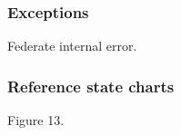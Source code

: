 \clearpage

\begin{compactstdpage}
    \subsubsection{Exceptions}
    \begin{stdalphalist}
        \item Federate internal error.
    \end{stdalphalist}

    \subsubsection{Reference state charts}
    \begin{stdalphalist}
        \item Figure 13.
    \end{stdalphalist}
\end{compactstdpage}
